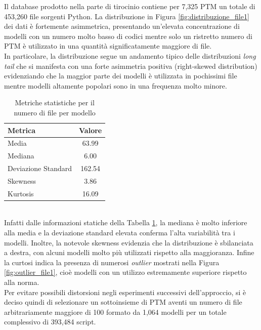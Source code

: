 \documentclass{article}
\begin{document}
Il database prodotto nella parte di tirocinio contiene per 7,325 PTM un totale di 453,260 file sorgenti Python. La distribuzione in Figura \ref{fig:distribuzione_file1} dei dati è fortemente asimmetrica, presentando un'elevata concentrazione di modelli con un numero molto basso di codici mentre solo un ristretto numero di PTM è utilizzato in una quantità significatamente maggiore di file.\\
In particolare, la distribuzione segue un andamento tipico delle distribuzioni \textit{long tail} che si manifesta con una forte asimmetria positiva (right-skewed distribution) evidenziando che la maggior parte dei modelli è utilizzata in pochissimi file mentre modelli altamente popolari sono in una frequenza molto minore.\\
\begin{table}[h]
    \centering
    \begin{tabular}{|l|c|}
        \hline
        \textbf{Metrica} & \textbf{Valore} \\
        \hline
        Media & 63.99 \\
        Mediana & 6.00 \\
        Deviazione Standard & 162.54 \\
        Skewness & 3.86 \\
        Kurtosis & 16.09 \\
        \hline
    \end{tabular}
    \caption{Metriche statistiche per il numero di file per modello}
    \label{tab:metriche_file_modello1}
\end{table}\\
Infatti dalle informazioni statiche della Tabella \ref{tab:metriche_file_modello1}, la mediana è molto inferiore alla media e la deviazione standard elevata conferma l'alta variabilità tra i modelli. Inoltre, la notevole skewness evidenzia che la distribuzione è sbilanciata a destra, con alcuni modelli molto più utilizzati rispetto alla maggioranza. Infine la curtosi indica la presenza di numerosi \textit{outlier} mostrati nella Figura \ref{fig:outlier_file1}, cioè modelli con un utilizzo estremamente superiore rispetto alla norma.\\
Per evitare possibili distorsioni negli esperimenti successivi dell'approccio, si è deciso quindi di selezionare un sottoinsieme di PTM aventi un numero di file arbitrariamente maggiore di 100 formato da 1,064 modelli per un totale complessivo di 393,484 script.\\
\end{document}
